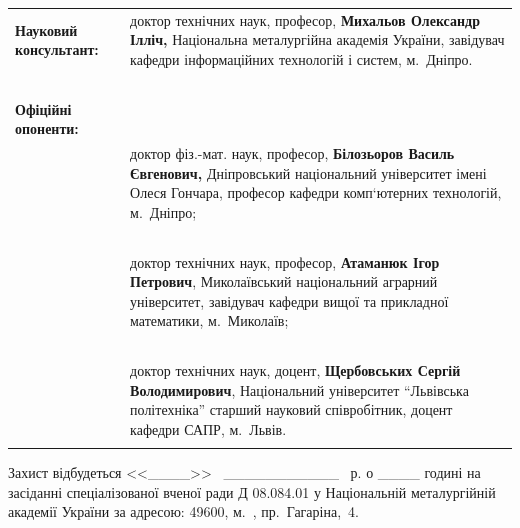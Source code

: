 \documentclass[a4paper,13pt]{atuaref}
\begin{document}
\noindent
\begin{tabular}{lp{}}
\textbf{Науковий консультант:}
&
доктор технічних наук, професор,\newline
\textbf{Михальов Олександр Ілліч,}\newline
Національна металургійна академія України, \newline
завідувач кафедри інформаційних технологій \newline
і систем, м.~Дніпро.
\\
{~} & {~}
\\
\textbf{Офіційні опоненти:}
{~}
\\
{~} &
доктор фіз.-мат. наук, професор,\newline
\textbf{Білозьоров Василь Євгенович,} \newline
Дніпровський національний університет імені \newline
Олеся Гончара, професор кафедри \newline
комп`ютерних технологій, м.~Дніпро;
\\
{~} & {~}
\\
{~} &
доктор технічних наук, професор,\newline
\textbf{Атаманюк Ігор Петрович}, \newline
Миколаївський національний \newline
аграрний університет, \newline
завідувач кафедри вищої та \newline
прикладної математики, м.~Миколаїв;
\\
{~} & {~}
\\
{~} &
доктор технічних наук, доцент,\newline
\textbf{Щербовських Сергій Володимирович}, \newline
Національний університет ``Львівська політехніка'' \newline
старший науковий співробітник, \newline
доцент кафедри САПР, м.~Львів.
\\
&
\end{tabular}


\vfill

Захист відбудеться
<<\_\_\_\_>>
~\_\_\_\_\_\_\_\_\_\_\_
\bookyear~р. о \_\_\_\_ годині
на засіданні спеціалізованої вченої ради Д 08.084.01 у Національній
металургійній академії України за адресою: 49600, м.~\cityUa,
пр.~Гагаріна,~4.
\end{document}
